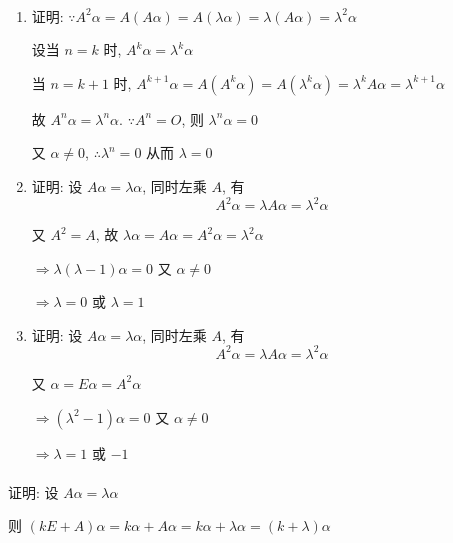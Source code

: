      \paragraph{} %
         \begin{enumerate}
             \item %
                   证明: \( \because A^{2}\alpha = A(A\alpha) = A(\lambda\alpha) = \lambda(A\alpha) = \lambda^{2}\alpha \)

                   设当 \( n = k \) 时, \( A^{k}\alpha = \lambda^{k}\alpha \)

                   当 \( n = k+1 \) 时, \( A^{k+1}\alpha = A(A^{k}\alpha) = A(\lambda^{k}\alpha) = \lambda^{k}A\alpha = \lambda^{k+1}\alpha \)

                   故 \( A^{n}\alpha = \lambda^{n}\alpha \). \( \because A^{n} = O \), 则 \( \lambda^{n}\alpha = 0 \)

                   又 \( \alpha \neq 0 \), \( \therefore \lambda^{n} = 0 \) 从而 \( \lambda = 0 \)
             \item %
                   证明: 设 \( A\alpha = \lambda\alpha \), 同时左乘 \( A \), 有
                   \[ A^{2}\alpha = \lambda A\alpha = \lambda^{2}\alpha \]

                   又 \( A^{2} = A \), 故 \( \lambda\alpha = A\alpha = A^{2}\alpha = \lambda^{2}\alpha \)

                   \( \Rightarrow \lambda(\lambda - 1)\alpha = 0 \) 又 \( \alpha \neq 0 \)

                   \( \Rightarrow \lambda = 0 \) 或 \( \lambda = 1 \)
             \item %
                   证明: 设 \( A\alpha = \lambda\alpha \), 同时左乘 \( A \), 有
                   \[ A^{2}\alpha = \lambda A\alpha = \lambda^{2}\alpha \]

                   又 \( \alpha = E\alpha = A^{2}\alpha \)

                   \( \Rightarrow (\lambda^{2} - 1)\alpha = 0 \) 又 \( \alpha \neq 0 \)

                   \( \Rightarrow \lambda = 1 \) 或 \( -1 \)
         \end{enumerate}


     \paragraph{} %
         证明: 设 \( A\alpha = \lambda\alpha \)

         则 \( (kE + A)\alpha = k\alpha + A\alpha = k\alpha + \lambda\alpha = (k + \lambda)\alpha \)

